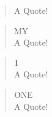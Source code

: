 \documentclass{article}
\newenvironment{myquote}{\begin{quote} MY\\}{\end{quote}}
\newenvironment{quote1}{\begin{quote} 1\\}{\end{quote}}
\begin{document}
\begin{quote}
A Quote!
\end{quote}

\begin{myquote}
A Quote!
\end{myquote}

\begin{quote1}
A Quote!
\end{quote1}

\renewenvironment{quote1}{\begin{quote} ONE\\}{\end{quote}}

\begin{quote1}
A Quote!
\end{quote1}
\end{document}
